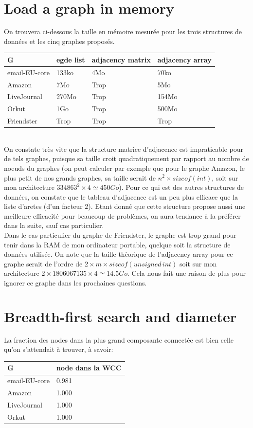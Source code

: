 \documentclass[a4paper]{report}
\begin{document}
\section{Load a graph in memory}
On trouvera ci-dessous la taille en mémoire mesurée pour les trois structures de données et les cinq graphes proposés.

\begin{tabular}{|l|l|l|l|}
  \hline
  G & egde list & adjacency matrix & adjacency array \\
  \hline
  email-EU-core & 133ko & 4Mo & 70ko \\
  Amazon & 7Mo & Trop & 5Mo \\
  LiveJournal & 270Mo & Trop & 154Mo \\
  Orkut & 1Go & Trop & 500Mo \\
  Friendster & Trop & Trop & Trop \\
  \hline
\end{tabular}\\
On constate très vite que la structure matrice d'adjacence est impraticable pour de tels graphes, puisque sa taille croit quadratiquement par rapport au nombre de noeuds du graphes (on peut calculer par exemple que pour le graphe Amazon, le plus petit de nos grands graphes, sa taille serait de $n^2 \times sizeof(int)$, soit sur mon architecture $334863^2 \times 4 \simeq 450Go$). Pour ce qui est des autres structures de données, on constate que le tableau d'adjacence est un peu plus efficace que la liste d'aretes (d'un facteur 2). Etant donné que cette structure propose aussi une meilleure efficacité pour beaucoup de problèmes, on aura tendance à la préférer dans la suite, sauf cas particulier.\\
Dans le cas particulier du graphe de Friendster, le graphe est trop grand pour tenir dans la RAM de mon ordinateur portable, quelque soit la structure de données utilisée. On note que la taille thèorique de l'adjacency array pour ce graphe serait de l'ordre de $2\times m \times sizeof(unsigned\,int)$ soit sur mon architecture $2 \times 1806067135 \times 4 \simeq 14.5Go$. Cela nous fait une raison de plus pour ignorer ce graphe dans les prochaines questions.

\section{Breadth-first search and diameter}

La fraction des nodes dans la plus grand composante connectée est bien celle qu'on s'attendait à trouver, à savoir:\\
\begin{tabular}{|l|l|}
  \hline
  G & node dans la WCC \\
  \hline
  email-EU-core & 0.981\\
  Amazon & 1.000\\
  LiveJournal & 1.000\\
  Orkut & 1.000\\
  \hline
\end{tabular}\\
\end{document}
